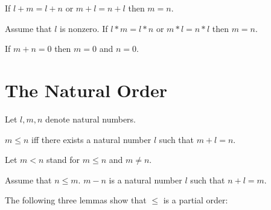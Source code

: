 \documentclass[english,11pt]{article}
\begin{document}
\begin{forthel}
\begin{axiom}
If $l + m = l + n$ or $m + l = n + l$ then $m = n$.
\end{axiom}

\begin{axiom}
Assume that $l$ is nonzero.
If $l * m = l * n$ or $m * l = n * l$ then $m = n$.
\end{axiom}

\begin{axiom}
If $m + n = 0$ then $m = 0$ and $n = 0$.
\end{axiom}

\end{forthel}


\section{The Natural Order}

\begin{forthel}
Let $l,m,n$ denote natural numbers.

\begin{definition}
$m \leq n$ iff
there exists a natural number $l$ such that $m + l = n$.
\end{definition}

Let $m < n$ stand for $m \leq n$ and $m \neq n$.

\begin{definition}
Assume that $n \leq m$.
$m - n$ is a natural number $l$ such that $n + l  = m$.
\end{definition}

\end{forthel}

The following three lemmas show that $\leq$ is a partial order:
\end{document}
